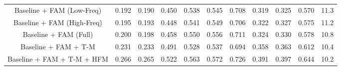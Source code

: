 \documentclass[lettersize,journal,onecolumn,12pt]{IEEEtran}
\begin{document}
\begin{table}[]
{\begin{tabular}{@{}c|ccc|ccc|ccc|c@{}}
Baseline + FAM (Low-Freq)         & 0.192                        & 0.190                         & 0.450                        & 0.538                        & 0.545                        & 0.708                        & 0.319                        & 0.325                        & 0.570                         & 11.3                           \\
Baseline + FAM (High-Freq)        & 0.195                        & 0.193                        & 0.448                        & 0.541                        & 0.549                        & 0.706                        & 0.322                        & 0.327                        & 0.575                        & 11.2                           \\
Baseline + FAM (Full)             & 0.200                          & 0.198                        & 0.458                        & 0.550                         & 0.556                        & 0.711                        & 0.324                        & 0.330                         & 0.578                        & 10.8                           \\
Baseline + FAM + T-M              & 0.231                        & 0.233                        & 0.491                        & 0.528                        & 0.537                        & 0.694                        & 0.358                        & 0.363                        & 0.612                        & 10.4                           \\
Baseline + FAM + T-M + HFM        & {\color[HTML]{FE0000} 0.266} & {\color[HTML]{FE0000} 0.265} & {\color[HTML]{FE0000} 0.522} & {\color[HTML]{FE0000} 0.563} & {\color[HTML]{FE0000} 0.572} & {\color[HTML]{FE0000} 0.726} & {\color[HTML]{FE0000} 0.391} & {\color[HTML]{FE0000} 0.397} & {\color[HTML]{FE0000} 0.644} & {\color[HTML]{FE0000} 10.2}    \\ \bottomrule
\end{tabular}}
\label{abla_r1}
\end{table}
\end{document}
